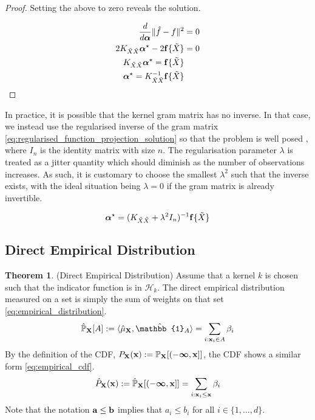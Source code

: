 \documentclass[twoside]{article} \usepackage{aistats2017}
\theoremstyle{definition}
\theoremstyle{theorem}
\newtheorem{theorem}{Theorem}[section]
\newcommand{\rv}[1]{{#1}}
\newcommand{\ds}[1]{\tilde{#1}}
\newcommand{\inner}[2]{{\langle #1, #2 \rangle}}
\begin{document}
\begin{proof}
			Setting the above to zero reveals the solution.
			
			\begin{align*}
				\frac{d}{d \bm{\alpha}} \Vert \hat{f} - f \Vert^{2} &= 0 \\
				2 K_{\ds{X} \ds{X}}  \bm{\alpha}^{\star} - 2 \bvec{f}\{\ds{X}\} &= 0 \\
				K_{\ds{X} \ds{X}}  \bm{\alpha}^{\star} = \bvec{f}\{\ds{X}\} \\
				\bm{\alpha}^{\star} = K_{\ds{X} \ds{X}}^{-1} \bvec{f}\{\ds{X}\}
			\end{align*}
		\end{proof}
		
		In practice, it is possible that the kernel gram matrix has no inverse. In that case, we instead use the regularised inverse of the gram matrix \eqref{eq:regularised_function_projection_solution} so that the problem is well posed \citep{muandet2016kernel}, where $I_{n}$ is the identity matrix with size $n$. The regularisation parameter $\lambda$ is treated as a jitter quantity which should diminish as the number of observations increases. As such, it is customary to choose the smallest $\lambda^{2}$ such that the inverse exists, with the ideal situation being $\lambda = 0$ if the gram matrix is already invertible. 
		
		\begin{equation}
			\bm{\alpha}^{\star} = (K_{\ds{X} \ds{X}} + \lambda^{2} I_{n})^{-1} \bvec{f}\{\ds{X}\}
		\label{eq:regularised_function_projection_solution}
		\end{equation}

	\subsection{Direct Empirical Distribution}
	\label{sec:direct_quantile_regression:direct_empirical_distribution}

		\begin{theorem} \label{thm:empirical_distribution_and_cdf}
			(Direct Empirical Distribution)
			Assume that a kernel $k$ is chosen such that the indicator function is in $\mathcal{H}_{k}$. The direct empirical distribution measured on a set is simply the sum of weights on that set \eqref{eq:empirical_distribution}.
			\begin{equation}
				\hat{\mathbb{P}}_{\bvec{\rv{X}}}[A] := \inner{\hat{\mu}_{\bvec{\rv{X}}}}{ \hat{\mathbb{1}}_{A}} = \sum_{i : \bvec{x}_{i} \in A} \beta_{i}
			\label{eq:empirical_distribution}
			\end{equation}
			By the definition of the CDF, $P_{\bvec{\rv{X}}}(\bvec{x}) := \mathbb{P}_{\bvec{\rv{X}}}[(-\bm{\infty}, \bvec{x}]]$, the CDF shows a similar form \eqref{eq:empirical_cdf}.
			\begin{equation}
				\hat{P}_{\bvec{\rv{X}}}(\bvec{x}) := \hat{\mathbb{P}}_{\bvec{\rv{X}}}[(-\bm{\infty}, \bvec{x}]] = \sum_{i : \bvec{x}_{i} \leq \bvec{x}} \beta_{i}
			\label{eq:empirical_cdf}
			\end{equation}
			Note that the notation $\mathbf{a} \leq \mathbf{b}$ implies that $a_{i} \leq b_{i}$ for all $i \in \{1, \dots, d\}$.
		\end{theorem}
			
\end{document}
